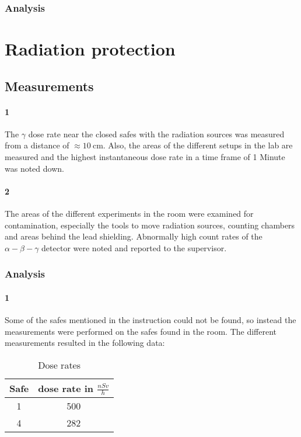 \documentclass[12pt,twoside,a4paper]{scrartcl}
\begin{document}
		\subsubsection{Analysis}

	\section{Radiation protection}

	\subsection{Measurements}
		\paragraph{1}
		The $\gamma$ dose rate near the closed safes with the radiation sources was measured from a distance of $\approx \SI{10}{\centi \metre}$.
		Also, the areas of the different setups in the lab are measured and the highest instantaneous dose rate in a time frame of 1 Minute was noted down.

		\paragraph{2}
			The areas of the different experiments in the room were examined for contamination, especially the tools to move radiation sources, counting chambers and areas behind the lead shielding. Abnormally high count rates of the $\alpha - \beta - \gamma$ detector were noted and reported to the supervisor.

	\subsubsection{Analysis}
		\paragraph{1}

			Some of the safes mentioned in the instruction could not be found, so instead the measurements were performed on the safes found in the room.
			The different measurements resulted in the following data:

			\begin{table}[H]
				\centering
				\caption{Dose rates}
				\label{Dose::safes}
				\begin{tabular}{|c|c|}
					\hline
					Safe & dose rate in $\frac{nSv}{h}$ \\
					\hline
					1		&		500 \\
					4		&		282 \\
					\hline
				\end{tabular}
			\end{table}
\end{document}
